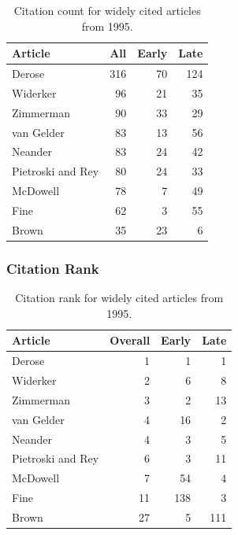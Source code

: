 \documentclass[
  10pt,
  letterpaper,
  DIV=11,
  numbers=noendperiod,
  twoside]{scrartcl}
\begin{document}
\begin{longtable}[]{@{}lrrr@{}}

\caption{\label{tbl-citation-count-1995}Citation count for widely cited
articles from 1995.}

\tabularnewline

\toprule\noalign{}
Article & All & Early & Late \\
\midrule\noalign{}
\endhead
\bottomrule\noalign{}
\endlastfoot
Derose & 316 & 70 & 124 \\
Widerker & 96 & 21 & 35 \\
Zimmerman & 90 & 33 & 29 \\
van Gelder & 83 & 13 & 56 \\
Neander & 83 & 24 & 42 \\
Pietroski and Rey & 80 & 24 & 33 \\
McDowell & 78 & 7 & 49 \\
Fine & 62 & 3 & 55 \\
Brown & 35 & 23 & 6 \\

\end{longtable}

\subsubsection*{Citation Rank}\label{sec-rank-1995}

\begin{longtable}[]{@{}lrrr@{}}

\caption{\label{tbl-citation-rank-1995}Citation rank for widely cited
articles from 1995.}

\tabularnewline

\toprule\noalign{}
Article & Overall & Early & Late \\
\midrule\noalign{}
\endhead
\bottomrule\noalign{}
\endlastfoot
Derose & 1 & 1 & 1 \\
Widerker & 2 & 6 & 8 \\
Zimmerman & 3 & 2 & 13 \\
van Gelder & 4 & 16 & 2 \\
Neander & 4 & 3 & 5 \\
Pietroski and Rey & 6 & 3 & 11 \\
McDowell & 7 & 54 & 4 \\
Fine & 11 & 138 & 3 \\
Brown & 27 & 5 & 111 \\

\end{longtable}
\end{document}
